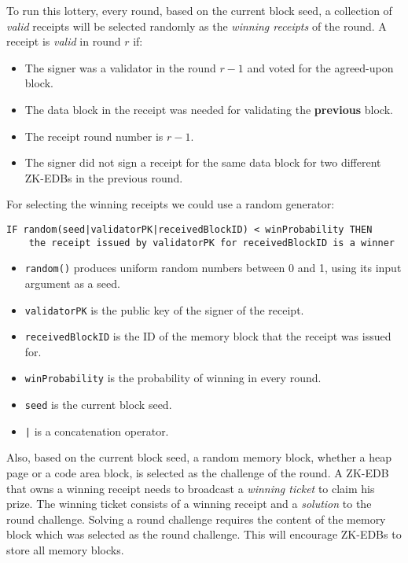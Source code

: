 
To run this lottery, every round, based on the current block seed, a collection of \emph{valid} receipts will be
selected randomly as the \emph{winning receipts} of the round. A receipt is \emph{valid} in round $r$ if:

\begin{itemize}
    \item The signer was a validator in the round $r - 1$ and voted for the agreed-upon block.
    \item The data block in the receipt was needed for validating the \textbf{previous} block.
    \item The receipt round number is $r - 1$.
    \item The signer did not sign a receipt for the same data block for two different ZK-EDBs in the previous round.
\end{itemize}
For selecting the winning receipts we could use a random generator:
\begin{verbatim}
IF random(seed|validatorPK|receivedBlockID) < winProbability THEN
    the receipt issued by validatorPK for receivedBlockID is a winner
\end{verbatim}
\begin{itemize}
    \item \texttt{random()} produces uniform random numbers between 0 and 1, using its input argument as a seed.
    \item \texttt{validatorPK} is the public key of the signer of the receipt.
    \item \texttt{receivedBlockID} is the ID of the memory block that the receipt was issued for.
    \item \texttt{winProbability} is the probability of winning in every round.
    \item \texttt{seed} is the current block seed.
    \item \texttt{|} is a concatenation operator.
\end{itemize}


Also, based on the current block seed, a random memory block, whether a heap page or a code area block, is
selected as the challenge of the round. A ZK-EDB that owns a winning receipt needs to broadcast a \emph{winning
ticket} to claim his prize. The winning ticket consists of a winning receipt and a \emph{solution} to the round
challenge. Solving a round challenge requires the content of the memory block which was selected as the round
challenge. This will encourage ZK-EDBs to store all memory blocks.


